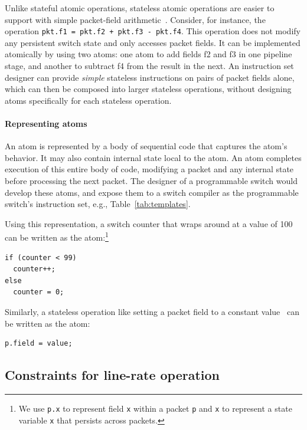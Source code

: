 Unlike stateful atomic operations, stateless atomic operations are easier to
support with simple packet-field arithmetic~\cite{rmt}.  Consider, for
instance, the operation {\tt pkt.f1 = pkt.f2 + pkt.f3 - pkt.f4}.  This
operation does not modify any persistent switch state and only accesses packet
fields. It can be implemented atomically by using two atoms: one atom to add
fields f2 and f3 in one pipeline stage, and another to subtract f4 from the
result in the next. An instruction set designer can provide {\em simple}
stateless instructions on pairs of packet fields alone, which can then be
composed into larger stateless operations, without designing atoms specifically
for each stateless operation.

\paragraph{Representing atoms}
An atom is represented by a body of sequential code that captures the atom's
behavior. It may also contain internal state local to the atom. An atom
completes execution of this entire body of code, modifying a packet and any
internal state before processing the next packet. The designer of a
programmable switch would develop these atoms, and expose them to a switch
compiler as the programmable switch's instruction set, e.g.,
Table~\ref{tab:templates}.

Using this representation, a switch counter that wraps around at a
value of 100 can be written as the atom:\footnote{We use {\tt p.x} to
  represent field {\tt x} within a packet {\tt p} and {\tt x} to
  represent a state variable {\tt x} that persists across packets.}
\begin{lstlisting}[style=customc, numbers=none, frame=none]
if (counter < 99)
  counter++;
else
  counter = 0;
\end{lstlisting}

Similarly, a stateless operation like setting a packet field to a constant
value~\cite{rmt} can be written as the atom:
\begin{lstlisting}[style=customc, numbers=none, frame=none]
  p.field = value;
\end{lstlisting}

\subsection{Constraints for line-rate operation}
\label{s:atomConstraints}

